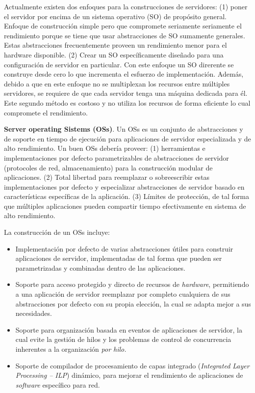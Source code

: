 Actualmente existen dos enfoques para la construcciones de servidores: (1) poner el servidor por encima de un sistema operativo (SO) de propósito general. Enfoque de construcción simple pero que compromete seriamente seriamente el rendimiento porque se tiene que usar abstracciones de SO sumamente generales. Estas abstracciones frecuentemente proveen un rendimiento menor para el hardware disponible. (2) Crear un SO específicamente diseñado para una configuración de servidor en particular. Con este enfoque un SO direrente se construye desde cero lo que incrementa el esfuerzo de implementación. Además, debido a que en este enfoque no se multiplexan los recursos entre múltiples servidores, se requiere de que cada servidor tenga una máquina dedicada para él. Este segundo método es costoso y no utiliza los recursos de forma eficiente lo cual compromete el rendimiento.

\textbf{Server operating Sistems (OSs)}. Un OSs es un conjunto de abstracciones y de soporte en tiempo de ejecución para aplicaciones de servidor especializada y de alto rendimiento. Un buen OSs debería proveer: (1) herramientas e implementaciones por defecto parametrizables de abstracciones de servidor (protocoles de red, almacenamiento) para la construcción modular de aplicaciones. (2) Total libertad para reemplazar o sobreescribir estas implementaciones por defecto y especializar abstracciones de servidor basado en características específicas de la aplicación. (3) Límites de protección, de tal forma que múltiples aplicaciones pueden compartir tiempo efectivamente en sistema de alto rendimiento.

La construcción de un OSs incluye:
\begin{itemize}
    \item Implementación por defecto de varias abstracciones útiles para construir aplicaciones de servidor, implementadas de tal forma que pueden ser parametrizadas y combinadas dentro de las aplicaciones.
    \item Soporte para acceso protegido y directo de recursos de \textit{hardware}, permitiendo a una aplicación de servidor reemplazar por completo cualquiera de sus abstracciones por defecto  con su propia elección, la cual se adapta mejor a sus necesidades.
    \item Soporte para organización basada en eventos de aplicaciones de servidor, la cual evite la gestión de hilos y los problemas de control de concurrencia inherentes a la organización \textit{por hilo.}
    \item Soporte de compilador de procesamiento de capas integrado (\textit{Integrated Layer Processing -- ILP}) dinámico, para mejorar el rendimiento de aplicaciones de \textit{software} específico para red.
\end{itemize}

